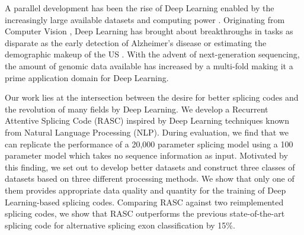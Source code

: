 


A parallel development has been the rise of Deep Learning enabled by the increasingly large available datasets and computing power \cite{deeplearning}. 
Originating from Computer Vision , Deep Learning has brought about breakthroughs in tasks as disparate as the early detection of Alzheimer's disease \cite{alzheimerdeeplearning} or estimating the demographic makeup of the US \cite{demographic}. 
With the advent of next-generation sequencing, the amount of genomic data available has increased by a multi-fold making it a prime application domain for Deep Learning. 


%
%
%



Our work lies at the intersection between the desire for better splicing codes and the revolution of many fields by Deep Learning. We develop a Recurrent Attentive Splicing Code (RASC) inspired by Deep Learning techniques known from Natural Language Processing (NLP). During evaluation, we find that we can replicate the performance of a 20,000 parameter splicing model using a 100 parameter model which takes no sequence information as input. Motivated by this finding, we set out to develop better datasets and construct three classes of datasets based on three different processing methods. We show that only one of them provides appropriate data quality and quantity for the training of Deep Learning-based splicing codes. Comparing RASC against two reimplemented splicing codes, we show that RASC outperforms the previous state-of-the-art splicing code for alternative splicing exon classification by 15\%. 

